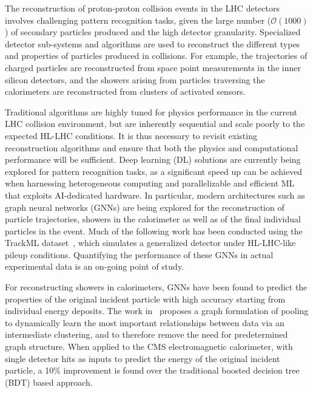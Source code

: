 The reconstruction of proton-proton collision events in the LHC detectors involves challenging pattern recognition tasks, given the large number ($\mathcal{O}(1000)$) of secondary particles produced and the high detector granularity. Specialized detector sub-systems and algorithms are used to reconstruct the different types and properties of particles produced in collisions. 
For example, the trajectories of charged particles are reconstructed from space point measurements in the inner silicon detectors, and the showers arising from particles traversing the calorimeters are reconstructed from clusters of activated sensors. 

Traditional algorithms are highly tuned for physics performance in the current LHC collision environment, but are inherently sequential and scale poorly to the expected HL-LHC conditions. 
It is thus necessary to revisit existing reconstruction algorithms and ensure that both the physics and computational performance will be sufficient. 
Deep learning (DL) solutions are currently being explored for pattern recognition tasks, as a significant speed up can be achieved when harnessing heterogeneous computing and parallelizable and efficient ML that exploits AI-dedicated hardware. In particular, modern architectures such as graph neural networks (GNNs) are being explored for the reconstruction of particle trajectories, showers in the calorimeter as well as of the final individual particles in the event. 
Much of the following work has been conducted using the TrackML dataset~\cite{trackml}, which simulates a generalized detector under HL-LHC-like pileup conditions. 
Quantifying the performance of these GNNs in actual experimental data is an on-going point of study.

For reconstructing showers in calorimeters, GNNs have been found to predict the properties of the original incident particle with high accuracy starting from individual energy deposits. The work in~\cite{Gray:2020mcm} proposes a graph formulation of pooling to dynamically learn the most important relationships between data via an intermediate clustering, and to therefore remove the need for predetermined graph structure. When applied to the CMS electromagnetic calorimeter, with single detector hits as inputs to predict the energy of the original incident particle, a 10\% improvement is found over the traditional boosted decision tree (BDT) based approach.

